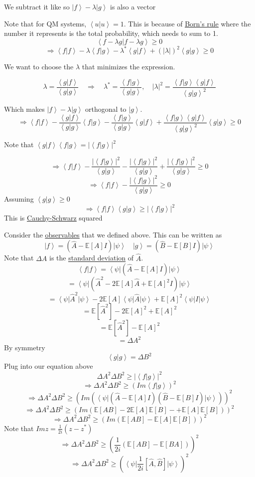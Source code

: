 \documentclass[
]{article}
\let\oldhyperref\hyperref
\renewcommand{\hyperref}[2][]{\oldhyperref[#1]{\underline{#2}}}
\providecommand{\ket}[1]{\left\lvert #1 \right\rangle}
\providecommand{\bra}[1]{\left\langle #1 \right\rvert}
\providecommand{\braket}[1]{\left\langle #1 \right\rangle}
\providecommand{\Rarr}{\Rightarrow}
\begin{document}
We subtract it like so \(\ket{f}-\lambda\ket{g}\) is also a vector

Note that for QM systems, \(\braket{u|u}=1\). This is because of \hyperref[borns-rule]{Born's rule} where the number it represents is the total probability, which needs to sum to 1.
\[
	\braket{f-\lambda g|f-\lambda g}\geq 0
\]
\[
	\Rarr\braket{f|f}-\lambda \braket{f|g} - \lambda^*\braket{g|f}+(|\lambda|)^2\braket{g|g}\geq 0
\]

We want to choose the \(\lambda\) that minimizes the expression.

\[
	\lambda=\frac{\braket{g|f}}{\braket{g|g}}\quad \Rarr \quad \lambda^*=\frac{\braket{f|g}}{\braket{g|g}},\quad |\lambda|^2=\frac{\braket{f|g}\braket{g|f}}{\braket{g|g}^2}
\]

Which makes \(\ket{f}-\lambda\ket{g}\) orthogonal to \(\ket{g}\).
\[
	\Rarr\braket{f|f}-\frac{\braket{g|f}}{\braket{g|g}} \braket{f|g} -\frac{\braket{f|g}}{\braket{g|g}}\braket{g|f} +\frac{\braket{f|g}\braket{g|f}}{\braket{g|g}^2}\braket{g|g}\geq 0
\]

Note that \(\braket{g|f}\braket{f|g}=|\braket{f|g}|^2\)

\[
	\Rarr \braket{f|f}-\frac{|\braket{f|g}|^2}{\braket{g|g}}-\frac{|\braket{f|g}|^2}{\braket{g|g}}+\frac{|\braket{f|g}|^2}{\braket{g|g}}\geq 0
\]
\[
	\Rarr \braket{f|f}-\frac{|\braket{f|g}|^2}{\braket{g|g}}\geq 0
\]
Assuming \(\braket{g|g}\geq 0\)
\[
	\Rarr \braket{f|f}\braket{g|g}\geq |\braket{f|g}|^2
\]
This is \hyperref[cauchy-schwarz-inequality]{Cauchy-Schwarz} squared


Consider the \hyperref[observables]{observables} that we defined above. This can be written as
\[
	\ket{f}=(\hat{A}-\mathbb{E}[A]I)\ket{\psi}\quad
	\ket{g}=(\hat{B}-\mathbb{E}[B]I)\ket{\psi}
\]
Note that \(\Delta A\) is the \hyperref[standard-deviation]{standard deviation} of \(\hat{A}\).
\[
	\braket{f|f}=\bra{\psi}(\hat{A}-\mathbb{E}[A]I)\ket{\psi}
\]
\[
	= \bra{\psi}\left(\hat{A}^2-2\mathbb{E}[A]\hat{A}+\mathbb{E}[A]^2I\right)\ket{\psi}
\]
\[
	= \bra{\psi}\hat{A}^2\ket{\psi}-2\mathbb{E}[A]\bra{\psi}\hat{A}\ket{\psi}+\mathbb{E}[A]^2\bra{\psi}I\ket{\psi}
\]
\[
	=\mathbb{E}[\hat{A}^2]-2\mathbb{E}[A]^2+\mathbb{E}[A]^2
\]
\[
	=\mathbb{E}[\hat{A}^2]-\mathbb{E}[A]^2
\]
\[
	=\Delta A^2
\]
By symmetry
\[
	\braket{g|g}=\Delta B^2
\]
Plug into our equation above
\[
	\Delta A^2\Delta B^2\geq |\braket{f|g}|^2
\]
\[
	\Rarr\Delta A^2\Delta B^2\geq (Im\braket{f|g})^2
\]
\[
	\Rarr\Delta A^2\Delta B^2\geq (Im(\bra{\psi}(\hat{A}-\mathbb{E}[A]I)(\hat{B}-\mathbb{E}[B]I)\ket{\psi}))^2
\]
\[
	\Rarr\Delta A^2\Delta B^2\geq (Im(\mathbb{E}[AB]-2\mathbb{E}[A]\mathbb{E}[B]-+ \mathbb{E}[A]\mathbb{E}[B]))^2
\]
\[
	\Rarr\Delta A^2\Delta B^2\geq (Im(\mathbb{E}[AB]-\mathbb{E}[A]\mathbb{E}[B]))^2
\]
Note that \(Im z=\frac{1}{2i}(z-z^*)\)
\[
	\Rarr\Delta A^2\Delta B^2\geq \left(\frac{1}{2i}(\mathbb{E}[AB]-\mathbb{E}[BA])\right)^2
\]
\[
	\Rarr\Delta A^2\Delta B^2\geq \left(\bra{\psi}\frac{1}{2i}[\hat{A},\hat{B}]\ket{\psi}\right)^2
\]
\end{document}

